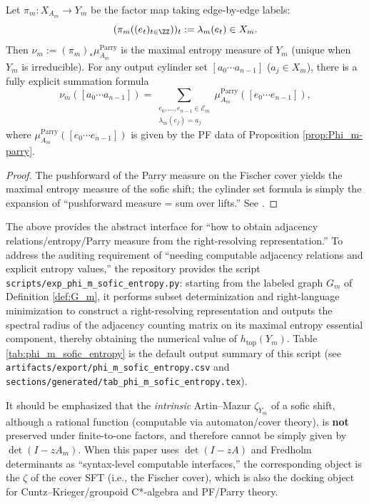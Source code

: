\begin{proposition}\label{prop:Phi_m-parry-pushforward}
Let $\pi_m:X_{A_m}\to Y_m$ be the factor map taking edge-by-edge labels:
\[
(\pi_m((e_t)_{t\in\ZZ}))_t:=\lambda_m(e_t)\in X_m.
\]
Then $\nu_m:=({\pi_m})_*\mu_{A_m}^{\mathrm{Parry}}$ is the maximal entropy measure of $Y_m$ (unique when $Y_m$ is irreducible). For any output cylinder set $[a_0\cdots a_{n-1}]$ ($a_j\in X_m$), there is a fully explicit summation formula
\[
\nu_m([a_0\cdots a_{n-1}])
=
\sum_{\substack{e_0,\dots,e_{n-1}\in\mathcal{E}_m\\ \lambda_m(e_j)=a_j}}
\mu_{A_m}^{\mathrm{Parry}}([e_0\cdots e_{n-1}]),
\]
where $\mu_{A_m}^{\mathrm{Parry}}([e_0\cdots e_{n-1}])$ is given by the PF data of Proposition \ref{prop:Phi_m-parry}.
\end{proposition}

\begin{proof}
The pushforward of the Parry measure on the Fischer cover yields the maximal entropy measure of the sofic shift; the cylinder set formula is simply the expansion of ``pushforward measure = sum over lifts.'' See \cite{LindMarcus1995,Kitchens1998SymbolicDynamics}.
\end{proof}

\begin{remark}\label{rem:phi_m_entropy_script}
The above provides the abstract interface for ``how to obtain adjacency relations/entropy/Parry measure from the right-resolving representation.'' To address the auditing requirement of ``needing computable adjacency relations and explicit entropy values,'' the repository provides the script \texttt{scripts/exp\_phi\_m\_sofic\_entropy.py}: starting from the labeled graph $G_m$ of Definition \ref{def:G_m}, it performs subset determinization and right-language minimization to construct a right-resolving representation and outputs the spectral radius of the adjacency counting matrix on its maximal entropy essential component, thereby obtaining the numerical value of $h_{\mathrm{top}}(Y_m)$. Table \ref{tab:phi_m_sofic_entropy} is the default output summary of this script (see \texttt{artifacts/export/phi\_m\_sofic\_entropy.csv} and \texttt{sections/generated/tab\_phi\_m\_sofic\_entropy.tex}).
\end{remark}



\begin{remark}\label{rem:sofic-zeta-vs-cover}
It should be emphasized that the \emph{intrinsic} Artin--Mazur \(\zeta_{Y_m}\) of a sofic shift, although a rational function (computable via automaton/cover theory), is \textbf{not} preserved under finite-to-one factors, and therefore cannot be simply given by \(\det(I-zA_m)\). When this paper uses \(\det(I-zA)\) and Fredholm determinants as ``syntax-level computable interfaces,'' the corresponding object is the \(\zeta\) of the cover SFT (i.e., the Fischer cover), which is also the docking object for Cuntz--Krieger/groupoid C*-algebra and PF/Parry theory.
\end{remark}
